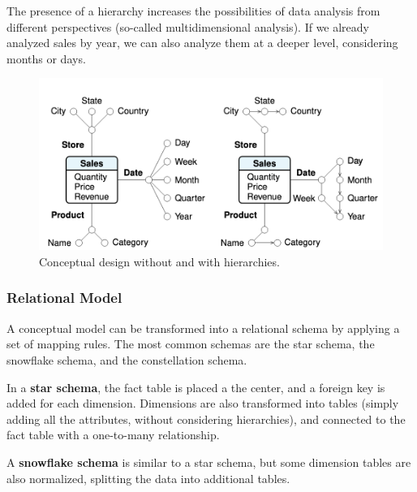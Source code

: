 The presence of a hierarchy increases the possibilities of data analysis from different perspectives (so-called multidimensional analysis). If we already analyzed sales by year, we can also analyze them at a deeper level, considering months or days.
\begin{figure}[ht]
    \centering
    \includegraphics[width=0.75\linewidth]{img/hierarchies.png}
    \caption{Conceptual design without and with hierarchies.}
    \label{fig:hierarchies}
\end{figure}

\subsubsection{Relational Model}

A conceptual model can be transformed into a relational schema by applying a set of mapping rules. The most common schemas are the star schema, the snowflake schema, and the constellation schema.

In a \textbf{star schema}, the fact table is placed a the center, and a foreign key is added for each dimension. Dimensions are also transformed into tables (simply adding all the attributes, without considering hierarchies), and connected to the fact table with a one-to-many relationship.

A \textbf{snowflake schema} is similar to a star schema, but some dimension tables are also normalized, splitting the data into additional tables.

